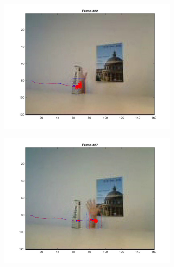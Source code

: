 \documentclass{ethz_report}
\begin{document}
\begin{figure}[h]
\begin{subfigure}[b]{.25\textwidth}
        \includegraphics[width=1\linewidth]{images/video2_noise_low_21}
    \end{subfigure}%
    \begin{subfigure}[b]{.25\textwidth}
        \centering
        \includegraphics[width=1\linewidth]{images/video2_noise_low_26}
    \end{subfigure}%
    \begin{subfigure}[b]{.25\textwidth}
        \centering

\end{subfigure}
\end{figure}
\end{document}
